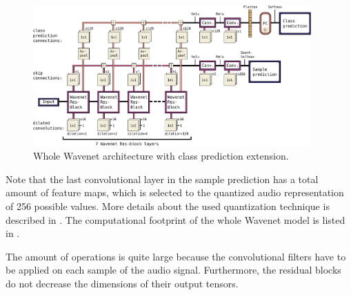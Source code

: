 \begin{figure}[!ht]
  \centering
    \includegraphics[width=0.95\textwidth]{./4_nn/figs/nn_arch_wavenet_all.pdf}
  \caption{Whole Wavenet architecture with class prediction extension.}
  \label{fig:nn_arch_wavenet_all}
\end{figure}
\FloatBarrier
\noindent
Note that the last convolutional layer in the sample prediction has a total amount of feature maps, which is selected to the quantized audio representation of 256 possible values.
More details about the used quantization technique is described in \cite{Oord2016}.
The computational footprint of the whole Wavenet model is listed in .

The amount of operations is quite large because the convolutional filters have to be applied on each sample of the audio signal.
Furthermore, the residual blocks do not decrease the dimensions of their output tensors.
